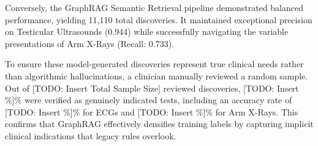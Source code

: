 \documentclass[pmlr]{jmlr}%
\begin{document}
\begin{table}[htbp]
    \centering
    \caption{Performance of imputation methods compared to the Regex baseline. False Positives (FP) represent potential clinical false negatives, termed ``Discoveries.''}
    \label{tab:imputation_results}
\end{table}

Conversely, the GraphRAG Semantic Retrieval pipeline demonstrated balanced performance, yielding 11,110 total discoveries. It maintained exceptional precision on Testicular Ultrasounds (0.944) while successfully navigating the variable presentations of Arm X-Rays (Recall: 0.733).

To ensure these model-generated discoveries represent true clinical needs rather than algorithmic hallucinations, a clinician manually reviewed a random sample. Out of [TODO: Insert Total Sample Size] reviewed discoveries, [TODO: Insert \%]\% were verified as genuinely indicated tests, including an accuracy rate of [TODO: Insert \%]\% for ECGs and [TODO: Insert \%]\% for Arm X-Rays. This confirms that GraphRAG effectively densifies training labels by capturing implicit clinical indications that legacy rules overlook.
\end{document}
